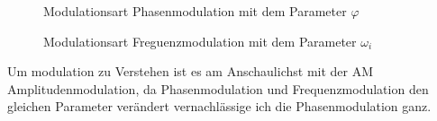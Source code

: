\begin{figure}[h]
	\centering
	
	\caption{Modulationsart Phasenmodulation mit dem Parameter \(\varphi\)}
	\label{fig:fm:PM}
\end{figure}

\begin{figure}[h]
	\centering
	
	\caption{Modulationsart Freguenzmodulation mit dem Parameter \(\omega_i\)}
	\label{fig:fm:FM}
\end{figure}

Um modulation zu Verstehen ist es am Anschaulichst mit der AM Amplitudenmodulation, 
da Phasenmodulation und Frequenzmodulation den gleichen Parameter verändert vernachlässige ich die Phasenmodulation ganz.




